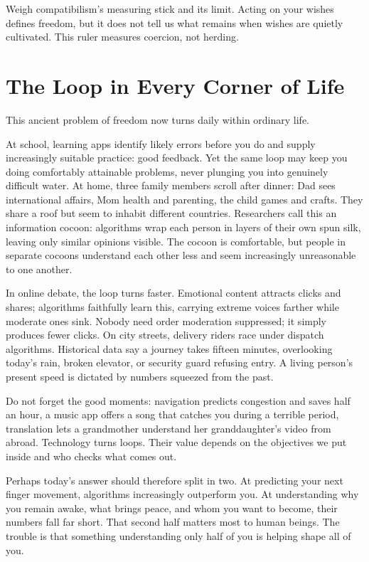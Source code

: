 Weigh compatibilism's measuring stick and its limit. Acting on your wishes defines freedom, but it does not tell us what remains when wishes are quietly cultivated. This ruler measures coercion, not herding.

\section{The Loop in Every Corner of Life}
This ancient problem of freedom now turns daily within ordinary life.

At school, learning apps identify likely errors before you do and supply increasingly suitable practice: good feedback. Yet the same loop may keep you doing comfortably attainable problems, never plunging you into genuinely difficult water. At home, three family members scroll after dinner: Dad sees international affairs, Mom health and parenting, the child games and crafts. They share a roof but seem to inhabit different countries. Researchers call this an information cocoon: algorithms wrap each person in layers of their own spun silk, leaving only similar opinions visible. The cocoon is comfortable, but people in separate cocoons understand each other less and seem increasingly unreasonable to one another.

In online debate, the loop turns faster. Emotional content attracts clicks and shares; algorithms faithfully learn this, carrying extreme voices farther while moderate ones sink. Nobody need order moderation suppressed; it simply produces fewer clicks. On city streets, delivery riders race under dispatch algorithms. Historical data say a journey takes fifteen minutes, overlooking today's rain, broken elevator, or security guard refusing entry. A living person's present speed is dictated by numbers squeezed from the past.

Do not forget the good moments: navigation predicts congestion and saves half an hour, a music app offers a song that catches you during a terrible period, translation lets a grandmother understand her granddaughter's video from abroad. Technology turns loops. Their value depends on the objectives we put inside and who checks what comes out.

Perhaps today's answer should therefore split in two. At predicting your next finger movement, algorithms increasingly outperform you. At understanding why you remain awake, what brings peace, and whom you want to become, their numbers fall far short. That second half matters most to human beings. The trouble is that something understanding only half of you is helping shape all of you.

